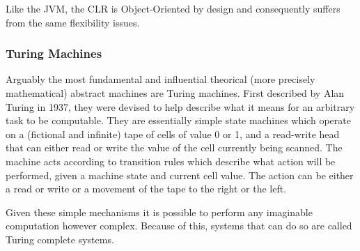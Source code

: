 Like the JVM, the CLR is Object-Oriented by design and consequently suffers from
the same flexibility issues.

\subsubsection{Turing Machines}

Arguably the most fundamental and influential theorical (more precisely
mathematical) abstract machines are Turing machines. First described by Alan
Turing in 1937\cite{sep-turing-machine}, they were devised to help describe what
it means for an arbitrary task to be computable. They are essentially simple
state machines which operate on a (fictional and infinite) tape of cells of
value 0 or 1, and a read-write head that can either read or write the value of
the cell currently being scanned\cite{sep-turing-machine}. The machine acts
according to transition rules which describe what action will be performed,
given a machine state and current cell value. The action can be either a read or
write or a movement of the tape to the right or the left.

Given these simple mechanisms it is possible to perform any imaginable
computation however complex. Because of this, systems that can do so are called
Turing complete systems.


